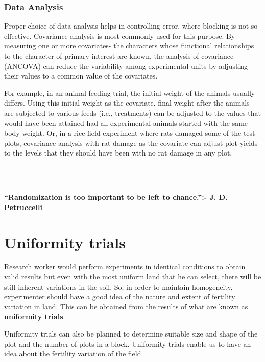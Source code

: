\documentclass[
]{book}
\begin{document}
\hypertarget{data-analysis}{%
\subsection{Data Analysis}\label{data-analysis}}

Proper choice of data analysis helps in controlling error, where blocking is not so effective. Covariance analysis is most commonly used for this purpose. By measuring one or more covariates- the characters whose functional relationships to the character of primary interest are known, the analysis of covariance (ANCOVA) can reduce the variability among experimental units by adjusting their values to a common value of the covariates.

For example, in an animal feeding trial, the initial weight of the animals usually differs. Using this initial weight as the covariate, final weight after the animals are subjected to various feeds (i.e., treatments) can be adjusted to the values that would have been attained had all experimental animals started with the same body weight. Or, in a rice field experiment where rats damaged some of the test plots, covariance analysis with rat damage as the covariate can adjust plot yields to the levels that they should have been with no rat damage in any plot.

~\\
\hspace*{0.333em}\\
\hspace*{0.333em}

\hypertarget{hello}{}
\textbf{``Randomization is too important to be left to chance.'':- J. D. Petruccelli}

\hypertarget{uniformity-trials}{%
\chapter{Uniformity trials}\label{uniformity-trials}}

Research worker would perform experiments in identical conditions to
obtain valid results but even with the most uniform land that he can
select, there will be still inherent variations in the soil. So, in
order to maintain homogeneity, experimenter should have a good idea of
the nature and extent of fertility variation in land. This can be
obtained from the results of what are known as \textbf{uniformity trials}.

Uniformity trials can also be planned to determine suitable size and
shape of the plot and the number of plots in a block. Uniformity trials
enable us to have an idea about the fertility variation of the field.
\end{document}
